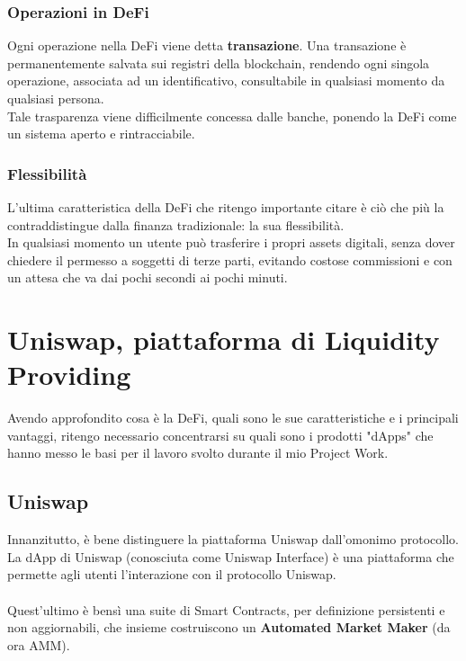 \documentclass{report}
\begin{document}
\subsection{Operazioni in DeFi}

Ogni operazione nella DeFi viene detta \textbf{transazione}. Una transazione è permanentemente salvata sui registri della blockchain, rendendo ogni singola operazione, associata ad un identificativo, consultabile in qualsiasi momento da qualsiasi persona.
\\Tale trasparenza viene difficilmente concessa dalle banche, ponendo la DeFi come un sistema aperto e rintracciabile.

\subsection{Flessibilità}

L'ultima caratteristica della DeFi che ritengo importante citare è ciò che più la contraddistingue dalla finanza tradizionale: la sua flessibilità.\\
In qualsiasi momento un utente può trasferire i propri assets digitali, senza dover chiedere il permesso a soggetti di terze parti, evitando costose commissioni e con un attesa che va dai pochi secondi ai pochi minuti. 


\chapter{Uniswap, piattaforma di Liquidity Providing}

Avendo approfondito cosa è la DeFi, quali sono le sue caratteristiche e i principali vantaggi, ritengo necessario concentrarsi su quali sono i prodotti "dApps" che hanno messo le basi per il lavoro svolto durante il mio Project Work.

\section{Uniswap}

Innanzitutto, è bene distinguere la piattaforma Uniswap\cite{uniswap} dall'omonimo protocollo.
\\La dApp di Uniswap (conosciuta come Uniswap Interface) è una piattaforma che permette agli utenti l'interazione con il protocollo Uniswap.
\\\\Quest'ultimo è bensì una suite di Smart Contracts, per definizione persistenti e non aggiornabili, che insieme costruiscono un \textbf{Automated Market Maker} (da ora AMM)\cite{amm}.
\end{document}
